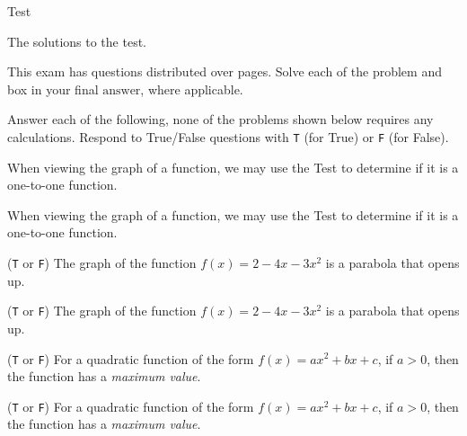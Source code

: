 \documentclass{article}
\title[\sExam]{\Exam}
\author{Dr.\ D. P. Story}
\date{\thisterm, \the\year}
\begin{document}
\maketitle


\begin{exam}{Test\nExam}

\ifsolutionsonly\NoPoints
\begin{instructions}[Solutions:]
The solutions to the test.
\end{instructions}
\else
\begin{instructions}[Instructions:]
This exam has {\nQuesInExam} questions distributed over {\nPagesOnExam} pages.
Solve each of the problem and box in your final $\boxed{\text{answer}}$, where applicable.
\end{instructions}
\fi

\begin{theseproblems}

\renameSolnAfterTo{}

\begin{problem*}[2ea]\label{shortAns}
Answer each of the following, none of the problems shown below requires any
calculations. Respond to True/False questions with \texttt{T} (for True) or \texttt{F} (for
False).
\begin{parts}
    \item When viewing the graph of a function, we may use the
     Test to determine if it is a
    one-to-one function.
\begin{solution}[]\ifvspacewithsolns
When viewing the graph of a function, we may use the
 Test to determine if it is a
one-to-one function.\fi
\end{solution}

    \item {} (\texttt{T} or \texttt{F}) The graph of the function $ f(x) =
    2-4x-3x^2$ is a parabola that opens up.
\begin{solution}[]\ifvspacewithsolns
{} (\texttt{T} or \texttt{F}) The graph of the function $ f(x) =
2-4x-3x^2$ is a parabola that opens up.\fi
\end{solution}

    \item {} (\texttt{T} or \texttt{F}) For a quadratic function of the form
    $f(x)=ax^2+bx+c$, if $a>0$, then the function has a \emph{maximum
    value}.
\begin{solution}[]\ifvspacewithsolns
{} (\texttt{T} or \texttt{F}) For a quadratic function of the form
    $f(x)=ax^2+bx+c$, if $a>0$, then the function has a \emph{maximum
    value}.\fi
\end{solution}


\end{parts}
\end{problem*}
\end{theseproblems}
\end{exam}
\end{document}

